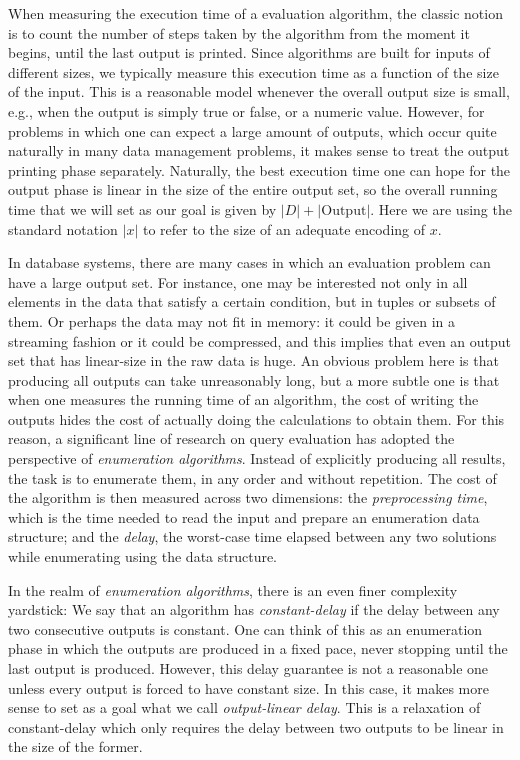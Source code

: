 When measuring the execution time of a evaluation algorithm, the classic notion is to count the number of steps taken by the algorithm from the moment it begins, until the last output is printed. Since algorithms are built for inputs of different sizes, we typically measure this execution time as a function of the size of the input.
This is a reasonable model whenever the overall output size is small, e.g., when the output is simply true or false, or a numeric value. However, for problems in which one can expect a large amount of outputs, which occur quite naturally in many data management problems, it makes sense to treat the output printing phase separately. Naturally, the best execution time one can hope for the output phase is linear in the size of the entire output set, so the overall running time that we will set as our goal is given by $|D| + |\text{Output}|$. Here we are using the standard notation $|x|$ to refer to the size of an adequate encoding of $x$.

In database systems, there are many cases in which an evaluation problem can have a large output set. For instance, one may be interested not only in all elements in the data that satisfy a certain condition, but in tuples or subsets of them. Or perhaps the data may not fit in memory: it could be given in a streaming fashion or it could be compressed, and this implies that even an output set that has linear-size in the raw data is huge. An obvious problem here is that producing all outputs can take unreasonably long, but a more subtle one is that when one measures the running time of an algorithm, the cost of writing the outputs hides the cost of actually doing the calculations to obtain them.
For this reason, a significant line
of research on query evaluation has adopted the perspective of {\it enumeration algorithms}.
Instead of explicitly producing all results, the task is to enumerate them, in any order and
without repetition. The cost of the algorithm is then measured across two dimensions:
the {\it preprocessing time}, which is the time needed to read the input and prepare an
enumeration data structure; and the {\it delay}, the worst-case time elapsed between any two
solutions while enumerating using the data structure.


In the realm of {\it enumeration algorithms}, there is an even finer complexity yardstick:
We say that an algorithm has {\it constant-delay} if the delay between any two consecutive outputs is constant. One can think of this as an enumeration phase in which the outputs are produced in a fixed pace, never stopping until the last output is produced. However, this delay guarantee is not a reasonable one unless every output is forced to have constant size. In this case, it makes more sense to set as a goal what we call {\it output-linear delay}. This is a relaxation of constant-delay which only requires the delay between two outputs to be linear in the size of the former.

